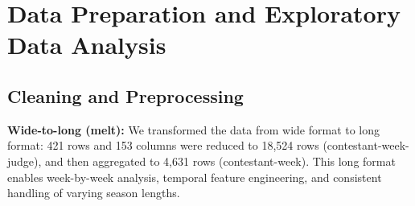 \documentclass{mcmthesis}
\begin{document}
\section{Data Preparation and Exploratory Data Analysis}

\subsection{Cleaning and Preprocessing}

\textbf{Wide-to-long (melt):}  
We transformed the data from wide format to long format: 421 rows and 153 columns were reduced to 18,524 rows (contestant-week-judge), and then aggregated to 4,631 rows (contestant-week). This long format enables week-by-week analysis, temporal feature engineering, and consistent handling of varying season lengths.
\end{document}
